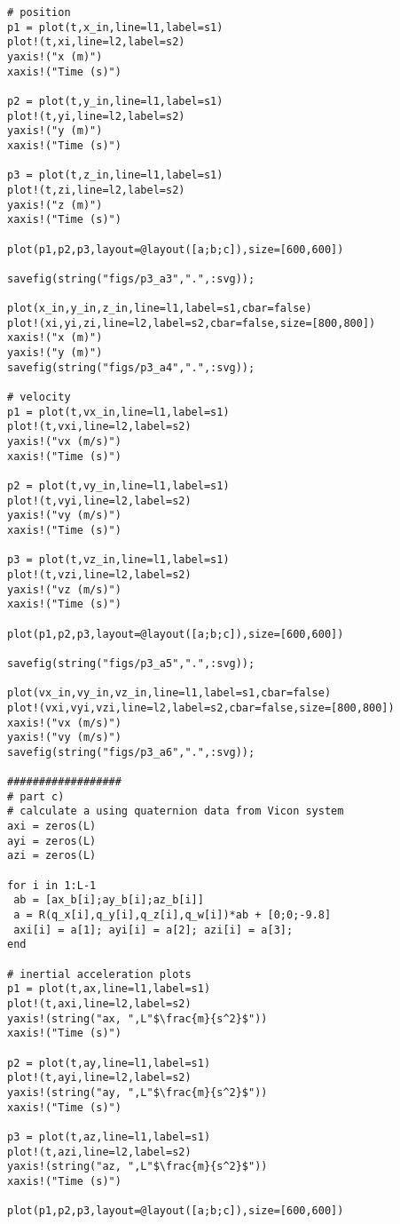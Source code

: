 \documentclass[paper=a4, fontsize=11pt]{scrartcl}
\numberwithin{equation}{section}		%
\numberwithin{figure}{section}			%
\numberwithin{table}{section}				%
\begin{document}
\begin{lstlisting}
# position
p1 = plot(t,x_in,line=l1,label=s1)
plot!(t,xi,line=l2,label=s2)
yaxis!("x (m)")
xaxis!("Time (s)")

p2 = plot(t,y_in,line=l1,label=s1)
plot!(t,yi,line=l2,label=s2)
yaxis!("y (m)")
xaxis!("Time (s)")

p3 = plot(t,z_in,line=l1,label=s1)
plot!(t,zi,line=l2,label=s2)
yaxis!("z (m)")
xaxis!("Time (s)")

plot(p1,p2,p3,layout=@layout([a;b;c]),size=[600,600])

savefig(string("figs/p3_a3",".",:svg));

plot(x_in,y_in,z_in,line=l1,label=s1,cbar=false)
plot!(xi,yi,zi,line=l2,label=s2,cbar=false,size=[800,800])
xaxis!("x (m)")
yaxis!("y (m)")
savefig(string("figs/p3_a4",".",:svg));

# velocity
p1 = plot(t,vx_in,line=l1,label=s1)
plot!(t,vxi,line=l2,label=s2)
yaxis!("vx (m/s)")
xaxis!("Time (s)")

p2 = plot(t,vy_in,line=l1,label=s1)
plot!(t,vyi,line=l2,label=s2)
yaxis!("vy (m/s)")
xaxis!("Time (s)")

p3 = plot(t,vz_in,line=l1,label=s1)
plot!(t,vzi,line=l2,label=s2)
yaxis!("vz (m/s)")
xaxis!("Time (s)")

plot(p1,p2,p3,layout=@layout([a;b;c]),size=[600,600])

savefig(string("figs/p3_a5",".",:svg));

plot(vx_in,vy_in,vz_in,line=l1,label=s1,cbar=false)
plot!(vxi,vyi,vzi,line=l2,label=s2,cbar=false,size=[800,800])
xaxis!("vx (m/s)")
yaxis!("vy (m/s)")
savefig(string("figs/p3_a6",".",:svg));

##################
# part c)
# calculate a using quaternion data from Vicon system
axi = zeros(L)
ayi = zeros(L)
azi = zeros(L)

for i in 1:L-1
 ab = [ax_b[i];ay_b[i];az_b[i]]
 a = R(q_x[i],q_y[i],q_z[i],q_w[i])*ab + [0;0;-9.8]
 axi[i] = a[1]; ayi[i] = a[2]; azi[i] = a[3];
end

# inertial acceleration plots
p1 = plot(t,ax,line=l1,label=s1)
plot!(t,axi,line=l2,label=s2)
yaxis!(string("ax, ",L"$\frac{m}{s^2}$"))
xaxis!("Time (s)")

p2 = plot(t,ay,line=l1,label=s1)
plot!(t,ayi,line=l2,label=s2)
yaxis!(string("ay, ",L"$\frac{m}{s^2}$"))
xaxis!("Time (s)")

p3 = plot(t,az,line=l1,label=s1)
plot!(t,azi,line=l2,label=s2)
yaxis!(string("az, ",L"$\frac{m}{s^2}$"))
xaxis!("Time (s)")

plot(p1,p2,p3,layout=@layout([a;b;c]),size=[600,600])


\end{lstlisting}
\end{document}
